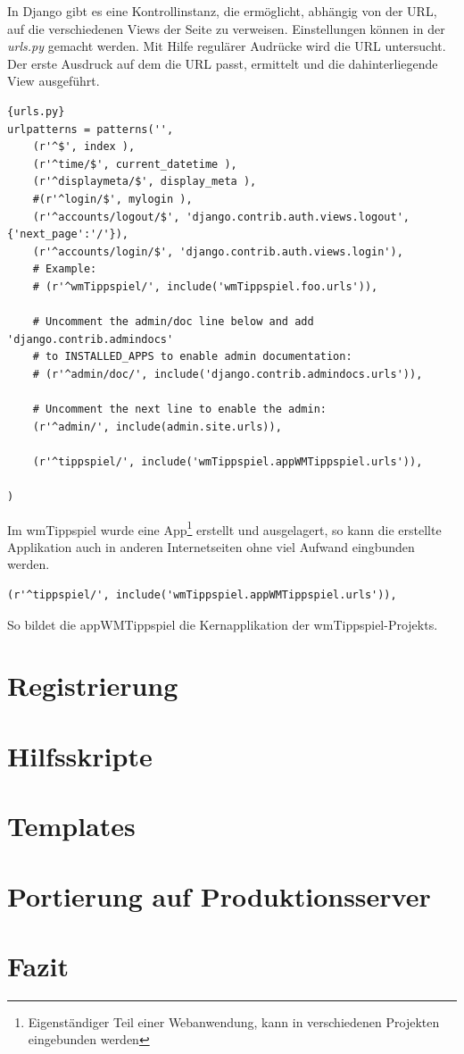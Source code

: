 \documentclass[titlepage, 12pt,a4paper]{scrartcl}
\begin{document}
In Django gibt es eine Kontrollinstanz, die ermöglicht, abhängig von der URL,
auf die verschiedenen Views der Seite zu verweisen. Einstellungen können in der
\emph{urls.py} gemacht werden. Mit Hilfe regulärer Audrücke wird die URL
untersucht. Der erste Ausdruck auf dem die URL passt, ermittelt und
die dahinterliegende View ausgeführt.

\begin{lstlisting}[caption=Auszug ursl.py]{urls.py}
urlpatterns = patterns('',
    (r'^$', index ),
    (r'^time/$', current_datetime ),
    (r'^displaymeta/$', display_meta ),
    #(r'^login/$', mylogin ),
    (r'^accounts/logout/$', 'django.contrib.auth.views.logout', {'next_page':'/'}),
    (r'^accounts/login/$', 'django.contrib.auth.views.login'),
    # Example:
    # (r'^wmTippspiel/', include('wmTippspiel.foo.urls')),

    # Uncomment the admin/doc line below and add 'django.contrib.admindocs'
    # to INSTALLED_APPS to enable admin documentation:
    # (r'^admin/doc/', include('django.contrib.admindocs.urls')),

    # Uncomment the next line to enable the admin:
    (r'^admin/', include(admin.site.urls)),
    
    (r'^tippspiel/', include('wmTippspiel.appWMTippspiel.urls')),
    
)
\end{lstlisting}

Im wmTippspiel wurde eine App\footnote{Eigenständiger Teil einer Webanwendung,
kann in verschiedenen Projekten eingebunden werden} erstellt und ausgelagert, so
kann die erstellte Applikation auch in anderen Internetseiten ohne viel Aufwand 
eingbunden werden.

\begin{lstlisting}
(r'^tippspiel/', include('wmTippspiel.appWMTippspiel.urls')),
\end{lstlisting}

So bildet die appWMTippspiel die Kernapplikation der wmTippspiel-Projekts.

\section{Registrierung}
\section{Hilfsskripte}
\label{hilfsskripte}

\section{Templates}
\section{Portierung auf Produktionsserver}
\section{Fazit}
\end{document}
